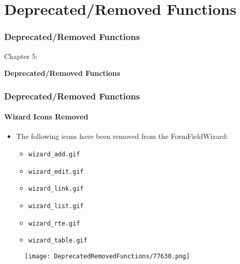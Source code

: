 %

\section{Deprecated/Removed Functions}
\begin{frame}[fragile]
	\frametitle{Deprecated/Removed Functions}

	\begin{center}\huge{Chapter 5:}\end{center}
	\begin{center}\huge{\color{typo3darkgrey}\textbf{Deprecated/Removed Functions}}\end{center}

\end{frame}

\begin{frame}[fragile]
	\frametitle{Deprecated/Removed Functions}
	\framesubtitle{Wizard Icons Removed}

	\begin{itemize}

		\item The following icons have been removed from the FormFieldWizard:

			\begin{itemize}
				\item \texttt{wizard\_add.gif}
				\item \texttt{wizard\_edit.gif}
				\item \texttt{wizard\_link.gif}
				\item \texttt{wizard\_list.gif}
				\item \texttt{wizard\_rte.gif}
				\item \texttt{wizard\_table.gif}
			\end{itemize}

	\end{itemize}

	\begin{figure}
		\texttt{[image: DeprecatedRemovedFunctions/77630.png]}
	\end{figure}

\end{frame}


